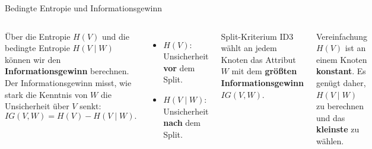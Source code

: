 \begin{frame}{Bedingte Entropie und Informationsgewinn}
\begin{columns}
Über die Entropie $H(V)$ und die bedingte Entropie $H(V \mid W)$ können wir den \textbf{Informationsgewinn} berechnen.\\
\medskip
Der Informationsgewinn misst, wie stark die Kenntnis von $W$ die
Unsicherheit über $V$ senkt:
\[
  IG(V, W) = H(V) - H(V \mid W).
\]

\begin{itemize}
  \item $H(V)$: Unsicherheit \textbf{vor} dem Split.
  \item $H(V \mid W)$: Unsicherheit \textbf{nach} dem Split.
\end{itemize}

\begin{blockC1}{Split-Kriterium}
\centering
\vspace{0.2em}
ID3 wählt an jedem Knoten das Attribut $W$ mit dem
\textbf{größten Informationsgewinn} $IG(V, W)$.
\vspace{0.2em}
\end{blockC1}

\vspace{0.4em}
\begin{blockC2}{Vereinfachung}
$H(V)$ ist an einem Knoten \textbf{konstant}. Es genügt daher, $H(V \mid W)$
zu berechnen und das \textbf{kleinste} zu wählen.
\end{blockC2}
\end{columns}
\end{frame}

